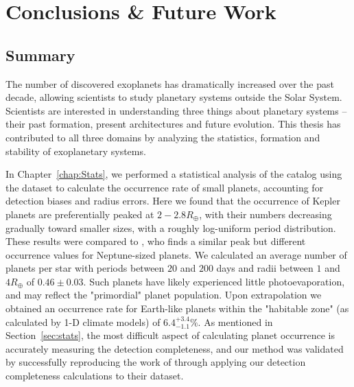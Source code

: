 \chapter{Conclusions \& Future Work}

\section{Summary}
The number of discovered exoplanets has dramatically increased over the past decade, allowing scientists to study planetary systems outside the Solar System. 
Scientists are interested in understanding three things about planetary systems -- their past formation, present architectures and future evolution. 
This thesis has contributed to all three domains by analyzing the statistics, formation and stability of exoplanetary systems. 

In Chapter~\ref{chap:Stats}, we performed a statistical analysis of the \kep catalog using the \citet{Ramirez2014} dataset to calculate the occurrence rate of small planets, accounting for detection biases and radius errors. 
Here we found that the occurrence of Kepler planets are preferentially peaked at $2-2.8R_\oplus$, with their numbers decreasing gradually toward smaller sizes, with a roughly log-uniform period distribution.
These results were compared to \citet{Petigura2013}, who finds a similar peak but different occurrence values for Neptune-sized planets. 
We calculated an average number of planets per star with periods between $20$ and $200$ days and radii between $1$ and $4R_\oplus$ of $0.46 \pm 0.03$. 
Such planets have likely experienced little photoevaporation, and may reflect the "primordial" planet population. 
Upon extrapolation we obtained an occurrence rate for Earth-like planets within the "habitable zone" (as calculated by 1-D climate models) of $6.4^{+3.4}_{-1.1}\%$. 
As mentioned in Section~\ref{sec:stats}, the most difficult aspect of calculating planet occurrence is accurately measuring the detection completeness, and our method was validated by successfully reproducing the work of \citet{Petigura2013} through applying our detection completeness calculations to their dataset.

